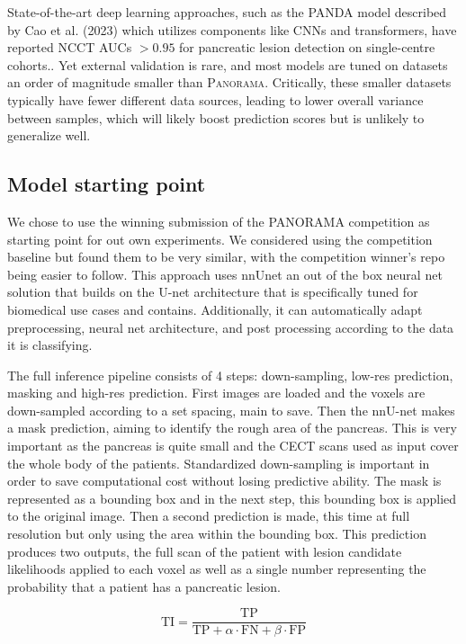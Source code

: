\documentclass[conference]{IEEEtran}
\begin{document}
State-of-the-art deep learning approaches, such as the PANDA model described by Cao et al. (2023) which utilizes components like CNNs and transformers, have reported NCCT AUCs $>0.95$ for pancreatic lesion detection on single-centre cohorts.\cite{Cao2023,PANDA2023}. Yet external validation is rare, and most models are tuned on datasets an order of magnitude smaller than \textsc{Panorama}. Critically, these smaller datasets typically have fewer different data sources, leading to lower overall variance between samples, which will likely boost prediction scores but is unlikely to generalize well.

\subsection{Model starting point}
We chose to use the winning submission of the PANORAMA competition as starting point for out own experiments. We considered using the competition baseline but found them to be very similar, with the competition winner's repo being easier to follow. This approach uses nnUnet \cite{b1} an out of the box neural net solution that builds on the U-net architecture that is specifically tuned for biomedical use cases and contains. Additionally, it can automatically adapt preprocessing, neural net architecture, and post processing according to the data it is classifying.

The full inference pipeline consists of 4 steps: down-sampling, low-res prediction, masking and high-res prediction. First images are loaded and the voxels are down-sampled according to a set spacing, main to save. Then the nnU-net makes a mask prediction, aiming to identify the rough area of the pancreas. This is very important as the pancreas is quite small and the CECT scans used as input cover the whole body of the patients. Standardized down-sampling is important in order to save computational cost without losing predictive ability. The mask is represented as a bounding box and in the next step, this bounding box is applied to the original image. Then a second prediction is made, this time at full resolution but only using the area within the bounding box. This prediction produces two outputs, the full scan of the patient with lesion candidate likelihoods applied to each voxel as well as a single number representing the probability that a patient has a pancreatic lesion.

\[
\text{TI} = \frac{\text{TP}}{\text{TP} + \alpha \cdot \text{FN} + \beta \cdot \text{FP}}
\]
\end{document}
